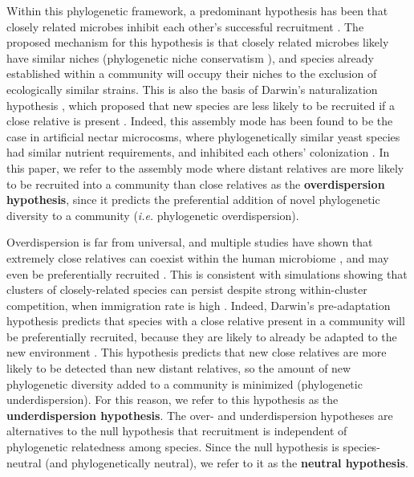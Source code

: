 \documentclass{article}
\begin{document}
\par
Within this phylogenetic framework, a predominant hypothesis has been that closely related microbes inhibit each other’s successful recruitment \cite{Nemergut2013,Fukami2015,Verster2018}. The proposed mechanism for this hypothesis is that closely related microbes likely have similar niches (phylogenetic niche conservatism \cite{Losos2008}), and species already established within a community will occupy their niches to the exclusion of ecologically similar strains. This is also the basis of Darwin’s naturalization hypothesis \cite{Darwin1859}, which proposed that new species are less likely to be recruited if a close relative is present \cite{Ma2016}. Indeed, this assembly mode has been found to be the case in artificial nectar microcosms, where phylogenetically similar yeast species had similar nutrient requirements, and inhibited each others’ colonization \cite{Peay2012}. In this paper, we refer to the assembly mode where distant relatives are more likely to be recruited into a community than close relatives as the \textbf{overdispersion hypothesis}, since it predicts the preferential addition of novel phylogenetic diversity to a community (\emph{i.e.} phylogenetic overdispersion).
\par
Overdispersion is far from universal, and multiple studies have shown that extremely close relatives can coexist within the human microbiome \cite{Li2016,Tett2019,Stecher2010}, and may even be preferentially recruited \cite{Brown2018}. This is consistent with simulations showing that clusters of closely-related species can persist despite strong within-cluster competition, when immigration rate is high \cite{DAndrea2019}. Indeed, Darwin’s pre-adaptation hypothesis predicts that species with a close relative present in a community will be preferentially recruited, because they are likely to already be adapted to the new environment \cite{Darwin1859}. This hypothesis predicts that new close relatives are more likely to be detected than new distant relatives, so the amount of new phylogenetic diversity added to a community is minimized (phylogenetic underdispersion). For this reason, we refer to this hypothesis as the \textbf{underdispersion hypothesis}. The over- and underdispersion hypotheses are alternatives to the null hypothesis that recruitment is independent of phylogenetic relatedness among species. Since the null hypothesis is species-neutral (and phylogenetically neutral), we refer to it as the \textbf{neutral hypothesis}.
\par
\end{document}
